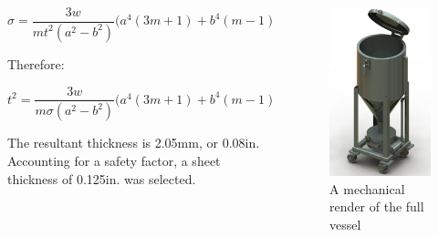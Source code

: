 \documentclass[final]{beamer}
\newlength{\onecolwid}
\newlength{\twocolwid}
\begin{document}
\begin{frame}[t]
\begin{columns}[t]
\begin{column}{\twocolwid}
\begin{columns}[t,totalwidth=\twocolwid]
\begin{column}{\onecolwid}
\scriptsize
\begin{equation}
\sigma = \frac{3w}{mt^{2}(a^{2} - b^{2})}\Big(a^{4}(3m + 1) + b^{4}(m - 1) - 4ma^{2}b^{2} - 4(m + 1)a^{2}b^{2}\ln(\frac{a}{b}) \Big)
\label{eq:stress}
\end{equation}
\normalsize

\noindent Therefore:

\scriptsize
\begin{equation}
t^{2} = \frac{3w}{m\sigma(a^{2} - b^{2})}\Big(a^{4}(3m + 1) + b^{4}(m - 1) - 4ma^{2}b^{2} - 4(m + 1)a^{2}b^{2}\ln(\frac{a}{b}) \Big)
\end{equation}
\normalsize

The resultant thickness is 2.05mm, or 0.08in. Accounting for a safety factor, a sheet thickness of 0.125in. was selected.


\end{column} %

\begin{column}{\onecolwid}\vspace{-.6in} %


\begin{figure}
\includegraphics[width=0.56\linewidth]{full-vessel-render.png}
\caption{A mechanical render of the full vessel}
\end{figure}


\end{column}
\end{columns}
\end{column}
\end{columns}
\end{frame}
\end{document}

